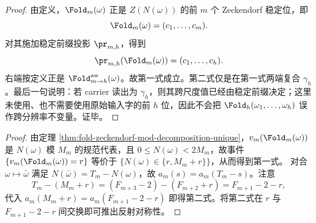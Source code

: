 \begin{proof}
由定义，\(\Fold_m(\omega)\) 正是 \(Z(N(\omega))\) 的前 \(m\) 个 Zeckendorf 稳定位，即
\[
\Fold_m(\omega)=(c_1,\ldots,c_m).
\]
对其施加稳定前缀投影 \(\pr_{m,h}\)，得到
\[
\pr_{m,h}(\Fold_m(\omega))=(c_1,\ldots,c_h).
\]
右端按定义正是 \(\Fold^{\rm aw}_{m\to h}(\omega)\)。故第一式成立。第二式仅是在第一式两端复合 \(\gamma_h\)。最后一句说明：若 carrier 读出为 \(\gamma_h\)，则其跨尺度值已经由稳定前缀决定；这里未使用、也不需要使用原始输入字的前 \(h\) 位，因此不会把 \(\Fold_h(\omega_1,\ldots,\omega_h)\) 误作跨分辨率不变量。证毕。
\end{proof}

\begin{proof}
由定理 \ref{thm:fold-zeckendorf-mod-decomposition-unique}，$v_m(\Fold_m(\omega))$ 是 $N(\omega)$ 模 $M_m$ 的规范代表，且 $0\le N(\omega)<2M_m$，故事件 $\{v_m(\Fold_m(\omega))=r\}$ 等价于 $\{N(\omega)\in\{r,M_m+r\}\}$，从而得到第一式。
对合 $\omega\mapsto\bar\omega$ 满足 $N(\bar\omega)=T_m-N(\omega)$，故 $a_m(s)=a_m(T_m-s)$。注意
\[
T_m-(M_m+r)=(F_{m+3}-2)-(F_{m+2}+r)=F_{m+1}-2-r,
\]
代入 $a_m(M_m+r)=a_m(F_{m+1}-2-r)$ 即得第二式。将第二式在 $r$ 与 $F_{m+1}-2-r$ 间交换即可推出反射对称性。
\end{proof}
